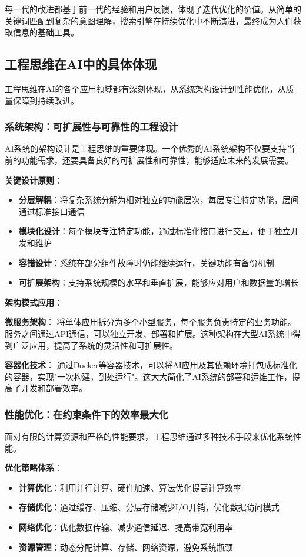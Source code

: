 每一代的改进都基于前一代的经验和用户反馈，体现了迭代优化的价值。从简单的关键词匹配到复杂的意图理解，搜索引擎在持续优化中不断演进，最终成为人们获取信息的基础工具。

\subsection{工程思维在AI中的具体体现}

工程思维在AI的各个应用领域都有深刻体现，从系统架构设计到性能优化，从质量保障到持续改进。

\subsubsection{系统架构：可扩展性与可靠性的工程设计}

AI系统的架构设计是工程思维的重要体现。一个优秀的AI系统架构不仅要支持当前的功能需求，还要具备良好的可扩展性和可靠性，能够适应未来的发展需要。

\textbf{关键设计原则}：
\begin{itemize}
\item \textbf{分层解耦}：将复杂系统分解为相对独立的功能层次，每层专注特定功能，层间通过标准接口通信
\item \textbf{模块化设计}：每个模块专注特定功能，通过标准化接口进行交互，便于独立开发和维护
\item \textbf{容错设计}：系统在部分组件故障时仍能继续运行，关键功能有备份机制
\item \textbf{可扩展架构}：支持系统规模的水平和垂直扩展，能够应对用户和数据量的增长
\end{itemize}

\textbf{架构模式应用}：

\textbf{微服务架构}：
将单体应用拆分为多个小型服务，每个服务负责特定的业务功能。服务之间通过API通信，可以独立开发、部署和扩展。这种架构在大型AI系统中得到广泛应用，提高了系统的灵活性和可扩展性。

\textbf{容器化技术}：
通过Docker等容器技术，可以将AI应用及其依赖环境打包成标准化的容器，实现"一次构建，到处运行"。这大大简化了AI系统的部署和运维工作，提高了开发和部署效率。

\subsubsection{性能优化：在约束条件下的效率最大化}

面对有限的计算资源和严格的性能要求，工程思维通过多种技术手段来优化系统性能。

\textbf{优化策略体系}：
\begin{itemize}
\item \textbf{计算优化}：利用并行计算、硬件加速、算法优化提高计算效率
\item \textbf{存储优化}：通过缓存、压缩、分层存储减少I/O开销，优化数据访问模式
\item \textbf{网络优化}：优化数据传输、减少通信延迟、提高带宽利用率
\item \textbf{资源管理}：动态分配计算、存储、网络资源，避免系统瓶颈
\end{itemize}

